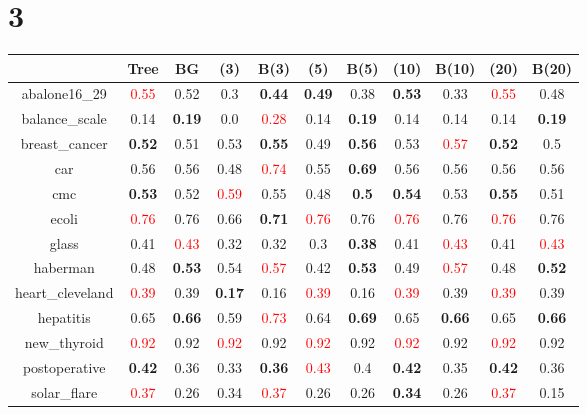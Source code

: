 \documentclass{article}%
\begin{document}
\section*{3}%
\begin{tabular}{c|cccccccccc}%
\hline%
&Tree&BG&(3)&B(3)&(5)&B(5)&(10)&B(10)&(20)&B(20)\\%
\hline%
abalone16\_29&\textcolor{red}{ 
0.55
}&0.52&0.3&\textbf{0.44}&\textbf{0.49}&0.38&\textbf{0.53}&0.33&\textcolor{red}{ 
0.55
}&0.48\\%
\hline%
balance\_scale&0.14&\textbf{0.19}&0.0&\textcolor{red}{ 
0.28
}&0.14&\textbf{0.19}&0.14&0.14&0.14&\textbf{0.19}\\%
\hline%
breast\_cancer&\textbf{0.52}&0.51&0.53&\textbf{0.55}&0.49&\textbf{0.56}&0.53&\textcolor{red}{ 
0.57
}&\textbf{0.52}&0.5\\%
\hline%
car&0.56&0.56&0.48&\textcolor{red}{ 
0.74
}&0.55&\textbf{0.69}&0.56&0.56&0.56&0.56\\%
\hline%
cmc&\textbf{0.53}&0.52&\textcolor{red}{ 
0.59
}&0.55&0.48&\textbf{0.5}&\textbf{0.54}&0.53&\textbf{0.55}&0.51\\%
\hline%
ecoli&\textcolor{red}{ 
0.76
}&0.76&0.66&\textbf{0.71}&\textcolor{red}{ 
0.76
}&0.76&\textcolor{red}{ 
0.76
}&0.76&\textcolor{red}{ 
0.76
}&0.76\\%
\hline%
glass&0.41&\textcolor{red}{ 
0.43
}&0.32&0.32&0.3&\textbf{0.38}&0.41&\textcolor{red}{ 
0.43
}&0.41&\textcolor{red}{ 
0.43
}\\%
\hline%
haberman&0.48&\textbf{0.53}&0.54&\textcolor{red}{ 
0.57
}&0.42&\textbf{0.53}&0.49&\textcolor{red}{ 
0.57
}&0.48&\textbf{0.52}\\%
\hline%
heart\_cleveland&\textcolor{red}{ 
0.39
}&0.39&\textbf{0.17}&0.16&\textcolor{red}{ 
0.39
}&0.16&\textcolor{red}{ 
0.39
}&0.39&\textcolor{red}{ 
0.39
}&0.39\\%
\hline%
hepatitis&0.65&\textbf{0.66}&0.59&\textcolor{red}{ 
0.73
}&0.64&\textbf{0.69}&0.65&\textbf{0.66}&0.65&\textbf{0.66}\\%
\hline%
new\_thyroid&\textcolor{red}{ 
0.92
}&0.92&\textcolor{red}{ 
0.92
}&0.92&\textcolor{red}{ 
0.92
}&0.92&\textcolor{red}{ 
0.92
}&0.92&\textcolor{red}{ 
0.92
}&0.92\\%
\hline%
postoperative&\textbf{0.42}&0.36&0.33&\textbf{0.36}&\textcolor{red}{ 
0.43
}&0.4&\textbf{0.42}&0.35&\textbf{0.42}&0.36\\%
\hline%
solar\_flare&\textcolor{red}{ 
0.37
}&0.26&0.34&\textcolor{red}{ 
0.37
}&0.26&0.26&\textbf{0.34}&0.26&\textcolor{red}{ 
0.37
}&0.15\\%

\end{tabular}
\end{document}
